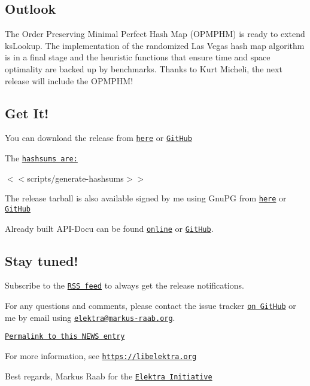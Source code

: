 \subsection*{Outlook}

The Order Preserving Minimal Perfect Hash Map (O\+P\+M\+P\+HM) is ready to extend {\ttfamily ks\+Lookup}. The implementation of the randomized Las Vegas hash map algorithm is in a final stage and the heuristic functions that ensure time and space optimality are backed up by benchmarks. Thanks to Kurt Micheli, the next release will include the O\+P\+M\+P\+H\+M!

\subsection*{Get It!}

You can download the release from \href{https://www.libelektra.org/ftp/elektra/releases/elektra-0.8.21.tar.gz}{\tt here} or \href{https://github.com/ElektraInitiative/ftp/blob/master/releases/elektra-0.8.21.tar.gz?raw=true}{\tt Git\+Hub}

The \href{https://github.com/ElektraInitiative/ftp/blob/master/releases/elektra-0.8.21.tar.gz.hashsum?raw=true}{\tt hashsums are\+:}

$<$$<${\ttfamily scripts/generate-\/hashsums}$>$$>$

The release tarball is also available signed by me using Gnu\+PG from \href{https://www.libelektra.org/ftp/elektra/releases/elektra-0.8.21.tar.gz.gpg}{\tt here} or \href{https://github.com/ElektraInitiative/ftp/blob/master/releases//elektra-0.8.21.tar.gz.gpg?raw=true}{\tt Git\+Hub}

Already built A\+P\+I-\/\+Docu can be found \href{https://doc.libelektra.org/api/0.8.21/html/}{\tt online} or \href{https://github.com/ElektraInitiative/doc/tree/master/api/0.8.21}{\tt Git\+Hub}.

\subsection*{Stay tuned!}

Subscribe to the \href{https://www.libelektra.org/news/feed.rss}{\tt R\+SS feed} to always get the release notifications.

For any questions and comments, please contact the issue tracker \href{http://issues.libelektra.org}{\tt on Git\+Hub} or me by email using \href{mailto:elektra@markus-raab.org}{\tt elektra@markus-\/raab.\+org}.

\href{https://doc.libelektra.org/news/0.8.21-release}{\tt Permalink to this N\+E\+WS entry}

For more information, see \href{https://libelektra.org}{\tt https\+://libelektra.\+org}

Best regards, Markus Raab for the \href{https://www.libelektra.org/developers/authors}{\tt Elektra Initiative} 